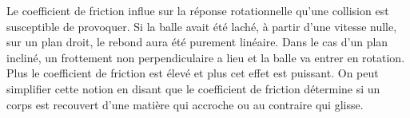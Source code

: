 Le coefficient de friction influe sur la réponse rotationnelle qu'une
collision est susceptible de provoquer. Si la balle avait été laché, à
partir d'une vitesse nulle, sur un plan droit, le rebond aura été
purement linéaire. Dans le cas d'un plan incliné, un frottement non
perpendiculaire a lieu et la balle va entrer en rotation. Plus le
coefficient de friction est élevé et plus cet effet est puissant. On
peut simplifier cette notion en disant que le coefficient de friction
détermine si un corps est recouvert d'une matière qui accroche ou au
contraire qui glisse.

\cite{newton87}

